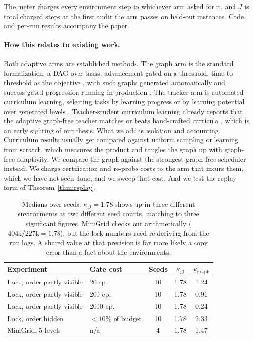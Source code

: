 \documentclass[11pt]{article}
\theoremstyle{plain}
\theoremstyle{definition}
\theoremstyle{remark}
\begin{document}
The meter charges every environment step to whichever arm asked for it, and $J$ is total charged
steps at the first audit the arm passes on held-out instances. Code and per-run results accompany
the paper.

\paragraph{How this relates to existing work.} Both adaptive arms are established methods. The graph
arm is the standard formalization: a DAG over tasks, advancement gated on a threshold, time to
threshold as the objective \cite{narvekar2020}, with such graphs generated automatically
\cite{svetlik2017} and success-gated progression running in production \cite{akkaya2019}. The
tracker arm is automated curriculum learning, selecting tasks by learning progress
\cite{graves2017,matiisen2020} or by learning potential over generated levels \cite{jiang2021}.
Teacher-student curriculum learning already reports that the adaptive graph-free teacher matches or
beats hand-crafted curricula \cite{matiisen2020}, which is an early sighting of our thesis. What we
add is isolation and accounting. Curriculum results usually get compared against uniform sampling or
learning from scratch, which measures the product and tangles the graph up with graph-free
adaptivity. We compare the graph against the strongest graph-free scheduler instead. We charge
certification and re-probe costs to the arm that incurs them, which we have not seen done, and we
sweep that cost. And we test the replay form of Theorem~\ref{thm:replay}.

\begin{table}[t]
\centering
\begin{tabular}{llccc}
\toprule
Experiment & Gate cost & Seeds & $\kappa_{\mathrm{gf}}$ & $\kappa_{\mathrm{graph}}$ \\
\midrule
Lock, order partly visible & 20 ep. & 10 & 1.78 & 1.24 \\
Lock, order partly visible & 200 ep. & 10 & 1.78 & 0.91 \\
Lock, order partly visible & 2000 ep. & 10 & 1.78 & 0.24 \\
Lock, order hidden & ${<}10\%$ of budget & 10 & 1.78 & 2.33 \\
MiniGrid, 5 levels & n/a & 4 & 1.78 & 1.47 \\
\bottomrule
\end{tabular}
\caption{Medians over seeds. $\kappa_{\mathrm{gf}}=1.78$ shows up in three
different environments at two different seed counts, matching to three significant figures.
MiniGrid checks out arithmetically ($404\mathrm{k}/227\mathrm{k}=1.78$), but the lock numbers need
re-deriving from the run logs. A shared value at that precision is far more likely a copy error than
a fact about the environments.}
\label{tab:results}
\end{table}
\end{document}
